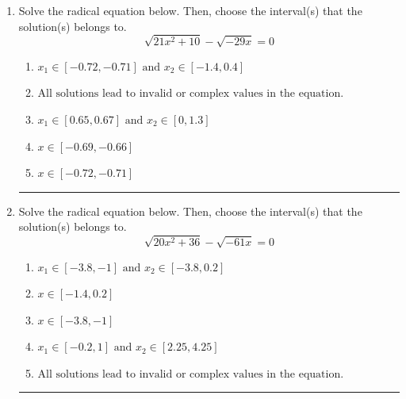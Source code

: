\documentclass[14pt]{extbook}
\newcommand{\litem}[1]{\item#1\hspace*{-1cm}\rule{\textwidth}{0.4pt}}
\begin{document}
\begin{enumerate}
\litem{
Solve the radical equation below. Then, choose the interval(s) that the solution(s) belongs to.\[ \sqrt{21 x^2 + 10} - \sqrt{-29 x} = 0 \]\begin{enumerate}[label=\Alph*.]
\item \( x_1 \in [-0.72, -0.71] \text{ and } x_2 \in [-1.4,0.4] \)
\item \( \text{All solutions lead to invalid or complex values in the equation.} \)
\item \( x_1 \in [0.65, 0.67] \text{ and } x_2 \in [0,1.3] \)
\item \( x \in [-0.69,-0.66] \)
\item \( x \in [-0.72,-0.71] \)

\end{enumerate} }
\litem{
Solve the radical equation below. Then, choose the interval(s) that the solution(s) belongs to.\[ \sqrt{20 x^2 + 36} - \sqrt{-61 x} = 0 \]\begin{enumerate}[label=\Alph*.]
\item \( x_1 \in [-3.8, -1] \text{ and } x_2 \in [-3.8,0.2] \)
\item \( x \in [-1.4,0.2] \)
\item \( x \in [-3.8,-1] \)
\item \( x_1 \in [-0.2, 1] \text{ and } x_2 \in [2.25,4.25] \)
\item \( \text{All solutions lead to invalid or complex values in the equation.} \)


\end{enumerate}}
\end{enumerate}
\end{document}
